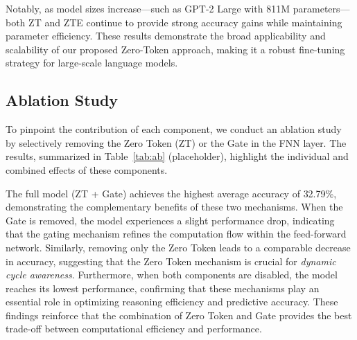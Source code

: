 Notably, as model sizes increase—such as GPT-2 Large with 811M parameters—both {ZT} and {ZTE} continue to provide strong accuracy gains while maintaining parameter efficiency. These results demonstrate the broad applicability and scalability of our proposed Zero-Token approach, making it a robust fine-tuning strategy for large-scale language models.


\subsection{Ablation Study}
\label{sec:ablation}



To pinpoint the contribution of each component, we conduct an ablation study by selectively removing the {Zero Token (ZT)} or the {Gate} in the FNN layer. The results, summarized in Table~\ref{tab:ab} (placeholder), highlight the individual and combined effects of these components.

The full model ({ZT + Gate}) achieves the highest average accuracy of {32.79\%}, demonstrating the complementary benefits of these two mechanisms. When the {Gate} is removed, the model experiences a slight performance drop, indicating that the gating mechanism refines the computation flow within the feed-forward network. Similarly, removing only the {Zero Token} leads to a comparable decrease in accuracy, suggesting that the Zero Token mechanism is crucial for \textit{dynamic cycle awareness}. 
Furthermore, when both components are disabled, the model reaches its lowest performance, confirming that these mechanisms play an essential role in optimizing reasoning efficiency and predictive accuracy. These findings reinforce that the combination of {Zero Token and Gate} provides the best trade-off between computational efficiency and performance.





